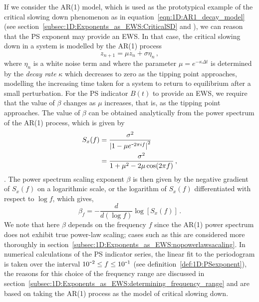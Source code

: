 {{{If we consider the AR(1) model, which is used as the prototypical example of the critical slowing down phenomenon as in equation~\ref{eqn:1D:AR1_decay_model} (see section~\ref{subsec:1D:Exponents_as_EWS:CriticalSD} and \cite{scheffer2009}), we can reason that the PS exponent may provide an EWS. In that case, the critical slowing down in a system is modelled by the AR(1) process
	\begin{equation}
	\label{eqn:1D:PSindicator:AR1model}
		z_{n+1} = \mu z_{n} + \sigma\eta_n\,,
	\end{equation}
where $\eta_n$ is a white noise term and where the parameter $\mu=e^{-\kappa\Delta t}$ is determined by the \emph{decay rate} $\kappa$ which decreases to zero as the tipping point approaches, modelling the increasing time taken for a system to return to equilibrium after a small perturbation. For the PS indicator $B(t)$ to provide an EWS, we require that the value of $\beta$ changes as $\mu$ increases, that is, as the tipping point approaches. The value of $\beta$ can be obtained analytically from the power spectrum of the AR(1) process, which is given by
	\begin{equation}
	\label{eqn:1D:PSindicator:AR1powerspectrum}
		\begin{split}
		S_x(f) &= \frac{\sigma^2}{\left|1-\mu e^{\textup{\texttt{-}}2\pi i f}\right|^2}\\
		&= \frac{\sigma^2}{1+ \mu^2 - 2\mu\cos(2\pi f)}\,,
		\end{split}
	\end{equation}
\citep{vonstorch}. The power spectrum scaling exponent $\beta$ is then given by the negative gradient of $S_x(f)$ on a logarithmic scale, or the logarithm of $S_x(f)$ differentiated with respect to $\log f$, which gives, 
	\begin{equation}
		\beta_f = -\frac{d}{d(\log f)}\log\left[S_x(f)\right]\,.
	\end{equation}
We note that here $\beta$ depends on the frequency $f$ since the AR(1) power spectrum does not exhibit true power-law scaling; cases such as this are considered more thoroughly in section~\ref{subsec:1D:Exponents_as_EWS:nopowerlawsacaling}. In numerical calculations of the PS indicator series, the linear fit to the periodogram is taken over the interval $10^{\textup{\texttt{-}}2}\leq f \leq 10^{\textup{\texttt{-}}1}$ (see definition~\ref{def:1D:PSexponent}), the reasons for this choice of the frequency range are discussed in section~\ref{subsec:1D:Exponents_as_EWS:determining_frequency_range} and are based on taking the AR(1) process as the model of critical slowing down. 

}}}
